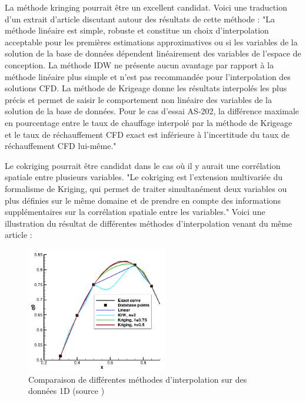 La méthode kringing pourrait être un excellent candidat. Voici une traduction d'un extrait d'article discutant autour des résultats de cette méthode :
"La méthode linéaire est simple, robuste et constitue un choix d'interpolation acceptable pour les premières estimations approximatives ou si les variables de la solution de la base de données dépendent linéairement des variables de l'espace de conception. La méthode IDW ne présente aucun avantage par rapport à la méthode linéaire plus simple et n'est pas recommandée pour l'interpolation des solutions CFD. La méthode de Krigeage donne les résultats interpolés les plus précis et permet de saisir le comportement non linéaire des variables de la solution de la base de données. Pour le cas d'essai AS-202, la différence maximale en pourcentage entre le taux de chauffage interpolé par la méthode de Krigeage et le taux de réchauffement CFD exact est inférieure à l'incertitude du taux de réchauffement CFD lui-même." \cite{palmer2009}


Le cokriging pourrait être candidat dans le cas où il y aurait une corrélation spatiale entre plusieurs variables.
"Le cokriging est l'extension multivariée du formalisme de Kriging, qui permet de traiter simultanément deux variables ou plus définies sur le même domaine et de prendre en compte des informations supplémentaires sur la corrélation spatiale entre les variables." \cite{kringing}
Voici une illustration du résultat de différentes méthodes d'interpolation venant du même article :

\begin{figure}[H]
    \centering
    \includegraphics[width=0.55\textwidth]{images/palmer2009_comp_copie.png}
    \caption{Comparaison de différentes méthodes d'interpolation sur des données 1D (source \cite{palmer2009})}
    \label{fig:compar}
\end{figure}

